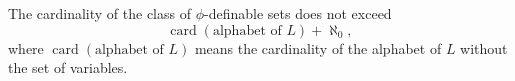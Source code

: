 The cardinality of the class of $\phi$-definable sets does not exceed
$$\operatorname{card}(\text{alphabet of } L) + \aleph_0,$$
where $\operatorname{card}(\text{alphabet of } L)$ means the cardinality of the alphabet of $L$ without the set of variables.
